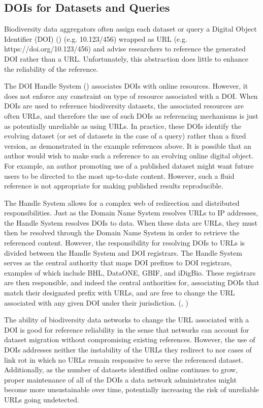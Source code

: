 \documentclass[12pt,letterpaper]{article}
\begin{document}
\subsection*{DOIs for Datasets and Queries}

Biodiversity data aggregators often assign each dataset or query a Digital Object Identifier (DOI) (\cite{Paskin_2009}) (e.g. 10.123/456) wrapped as URL (e.g. https://doi.org/10.123/456) and advise researchers to reference the generated DOI rather than a URL. Unfortunately, this abstraction does little to enhance the reliability of the reference. 

The DOI Handle System (\cite{Paskin_2009}) associates DOIs with online resources. However, it does not enforce any constraint on type of resource associated with a DOI. When DOIs are used to reference biodiversity datasets, the associated resources are often URLs, and therefore the use of such DOIs as referencing mechanisms is just as potentially unreliable as using URLs. In practice, these DOIs identify the evolving dataset (or set of datasets in the case of a query) rather than a fixed version, as demonstrated in the example references above. It is possible that an author would wish to make such a reference to an evolving online digital object. For example, an author promoting use of a published dataset might want future users to be directed to the most up-to-date content. However, such a fluid reference is not appropriate for making published results reproducible. 

The Handle System allows for a complex web of redirection and distributed responsibilities. Just as the Domain Name System resolves URLs to IP addresses, the Handle System resolves DOIs to data. When these data are URLs, they must then be resolved through the Domain Name System in order to retrieve the referenced content. However, the responsibility for resolving DOIs to URLs is divided between the Handle System and DOI registrars. The Handle System serves as the central authority that maps DOI prefixes to DOI registrars, examples of which include BHL, DataONE, GBIF, and iDigBio. These registrars are then responsible, and indeed the central authorities for, associating DOIs that match their designated prefix with URLs, and are free to change the URL associated with any given DOI under their jurisdiction. (\cite{Paskin_2009}, \cite{DOI_2018}) 

The ability of biodiversity data networks to change the URL associated with a DOI is good for reference reliability in the sense that networks can account for dataset migration without compromising existing references. However, the use of DOIs addresses neither the instability of the URLs they redirect to nor cases of link rot in which no URLs remain responsive to serve the referenced dataset. Additionally, as the number of datasets identified online continues to grow, proper maintenance of all of the DOIs a data network administrates might become more unsustainable over time, potentially increasing the risk of unreliable URLs going undetected. 
\end{document}
